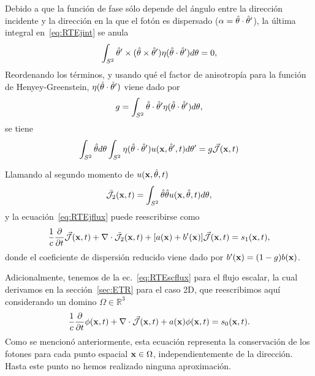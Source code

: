 Debido a que la función de fase sólo depende del ángulo entre 
la dirección incidente y la dirección en la que el fotón es dispersado ($\alpha=\hat{\theta} \cdot \hat{\theta}'$), la última integral en~\eqref{eq:RTEjint} se anula
\begin{equation}
\begin{split}
\begin{aligned}
\int_{S^2}  \hat{\theta}' \times(\hat{\theta} \times \hat{\theta}') \eta(\hat{\theta} \cdot \hat{\theta}') d\theta =0,
\end{aligned}
\end{split}
\label{eq:RTEjint2}
\end{equation}
Reordenando los términos, y usando qué
el factor de anisotropía para la función de Henyey-Greenstein, $\eta(\hat{\theta} \cdot \hat{\theta}')$ viene dado por 
\begin{equation}
g=\int_{S^2} \hat{\theta} \cdot \hat{\theta}' \eta(\hat{\theta} \cdot \hat{\theta}') d\theta,
\label{eq:gnorm}
\end{equation}
se tiene 
\begin{equation}
\begin{split}
\begin{aligned}
\int_{S^2} \hat{\theta} d\theta \int_{S^2} \eta(\hat{\theta} \cdot \hat{\theta}')  u(\mathbf{x},\hat{\theta}',t) d\theta' 
=g \vec{ \mathcal{J}}(\mathbf{x},t)
\end{aligned}
\end{split}
\label{eq:RTEjint}
\end{equation}

Llamando al segundo momento de $u(\mathbf{x},\hat{\theta},t)$
\begin{equation}
\bar{\mathcal{J}}_2(\mathbf{x},t)=\int_{S^2} \hat{\theta} \hat{\theta} u(\mathbf{x},\hat{\theta},t) d\theta,
\label{eq:RTEjflux2}
\end{equation}
y la ecuación~\eqref{eq:RTEjflux} puede reescribirse como
\begin{equation}
\begin{split}
\begin{aligned}
\frac{1}{c}\frac{\partial}{\partial t} \vec{ \mathcal{J}}(\mathbf{x},t)+\nabla \cdot \bar{\mathcal{J}}_2(\mathbf{x},t)+[a(\mathbf{x})+b'(\mathbf{x})]\vec{ \mathcal{J}}(\mathbf{x},t)=s_1(\mathbf{x},t),
\end{aligned}
\end{split}
\label{eq:RTEjfluxf}
\end{equation}
donde el coeficiente de dispersión reducido viene dado por $b'(\mathbf{x})=(1-g)b(\mathbf{x})$.

Adicionalmente, tenemos de la ec.~\eqref{eq:RTEscflux} para el flujo escalar, la cual derivamos en la 
sección~\ref{sec:ETR} para el caso 2D, que reescribimos aquí considerando un domino $\Omega \in \mathbb{R}^3$
\begin{equation}
\frac{1}{c}\frac{\partial}{\partial t} \phi(\mathbf{x},t)+\nabla \cdot \vec{ \mathcal{J}}(\mathbf{x},t)
+a(\mathbf{x})\phi(\mathbf{x},t)=s_0(\mathbf{x},t).
\label{eq:RTEscfluxap}
\end{equation}
Como se mencionó anteriormente, esta ecuación representa la conservación 
de los fotones para cada punto espacial $\mathbf{x} \in \Omega$, independientemente 
de la dirección. Hasta este punto no hemos realizado ninguna aproximación.

